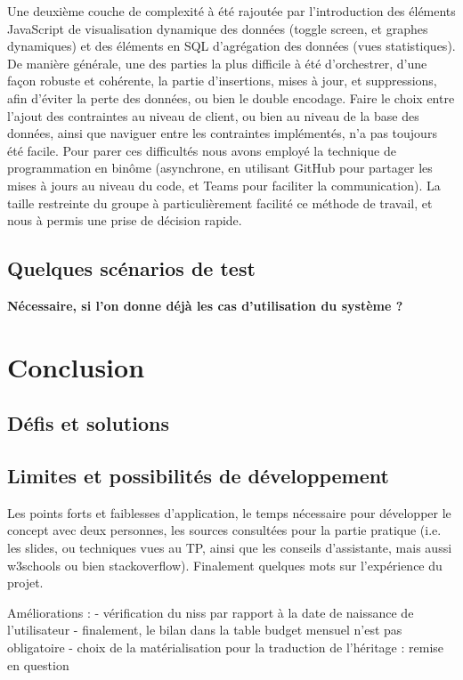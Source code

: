 \documentclass[a4paper,12pt]{article}
\begin{document}
Une deuxième couche de complexité à été rajoutée par l'introduction des éléments JavaScript de visualisation dynamique des données (toggle screen, et graphes dynamiques) et des éléments en SQL d'agrégation des données (vues statistiques).
De manière générale, une des parties la plus difficile à été d'orchestrer, d'une façon robuste et cohérente, la partie d'insertions, mises à jour, et suppressions, afin d'éviter la perte des données, ou bien le double encodage.
Faire le choix entre l'ajout des contraintes au niveau de client, ou bien au niveau de la base des données, ainsi que naviguer entre les contraintes implémentés, n'a pas toujours été facile.
Pour parer ces difficultés nous avons employé la technique de programmation en binôme (asynchrone, en utilisant GitHub pour partager les mises à jours au niveau du code, et Teams pour faciliter la communication).
La taille restreinte du groupe à particulièrement facilité ce méthode de travail, et nous à permis une prise de décision rapide.

\subsection{Quelques scénarios de test }

\textbf{Nécessaire, si l'on donne déjà les cas d'utilisation du système ?}

\newpage
\section{Conclusion}

\subsection{Défis et solutions}
\subsection{Limites et possibilités de développement}
Les points forts et faiblesses d’application, le temps nécessaire pour développer le concept avec deux personnes, les sources consultées pour la partie pratique (i.e. les slides, ou techniques vues au TP, ainsi que les conseils d’assistante, mais aussi w3schools ou bien stackoverflow).
Finalement quelques mots sur l'expérience du projet.

Améliorations : 
- vérification du niss par rapport à la date de naissance de l'utilisateur
- finalement, le bilan dans la table budget mensuel n'est pas obligatoire
- choix de la matérialisation pour la traduction de l'héritage : remise en question
\end{document}
